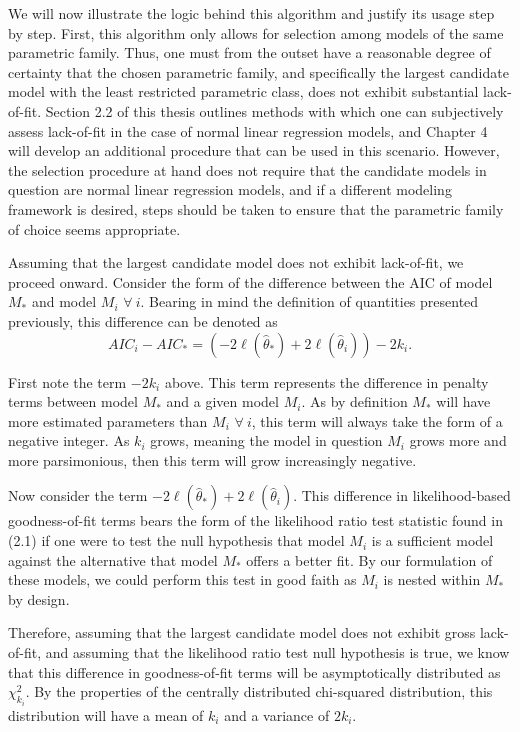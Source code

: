 		We will now illustrate the logic behind this algorithm and justify its usage step by step. First, this algorithm only allows for selection among models of the
		same parametric family. Thus, one must from the outset have a reasonable degree of certainty that the chosen parametric family, and specifically the largest candidate model
		with the least restricted parametric class, does not exhibit substantial lack-of-fit. Section 2.2 of this thesis outlines methods with which one can subjectively assess lack-of-fit in the case of normal linear regression
		models, and Chapter 4 will develop an additional procedure that can be used in this scenario. However, the selection procedure at hand does not require that the candidate models
		in question are normal linear regression models, and if a different modeling framework is desired, steps should be taken to ensure that the parametric family
		of choice seems appropriate.

		Assuming that the largest candidate model does not exhibit lack-of-fit, we proceed onward. Consider the form of the difference between the AIC of model $M_*$
		and model $M_i$ $\forall\: i$. Bearing in mind the definition of quantities presented previously, this difference can be denoted as
		\begin{equation*}
			AIC_i - AIC_* = \left( -2 \ell (\hat{\theta}_*) + 2 \ell (\hat{\theta}_i) \right) - 2k_i .
		\end{equation*}

		First note the term $-2k_i$ above. This term represents the difference in penalty terms between model $M_*$ and a given model $M_i$. As by definition
		$M_*$ will have more estimated parameters than $M_i$ $\forall\: i$, this term will always take the form of a negative integer. As $k_i$ grows, meaning
		the model in question $M_i$ grows more and more parsimonious, then this term will grow increasingly negative.

		Now consider the term $-2 \ell (\hat{\theta}_*) + 2 \ell (\hat{\theta}_i)$. This difference in likelihood-based goodness-of-fit terms bears the form
		of the likelihood ratio test statistic found in (2.1) if one were to test the null hypothesis that model $M_i$ is a sufficient model against the alternative that
		model $M_*$ offers a better fit. By our formulation of these models, we could perform this test in good faith as $M_i$ is nested within $M_*$ by 
		design.

		Therefore, assuming that the largest candidate model does not exhibit gross lack-of-fit, and assuming that the likelihood ratio test null hypothesis is true, we
		know that this difference in goodness-of-fit terms will be asymptotically distributed as $\chi^2_{k_i}$. By the properties of the centrally distributed chi-squared
		distribution, this distribution will have a mean of $k_i$ and a variance of $2 k_i$.

